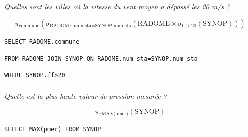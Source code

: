 \subparagraph{}
\textit{Quelles sont les villes où la vitesse du vent moyen a dépassé les 20 m/s ? }
\ifprof
\begin{corrige}
$$ \pi_{\text{commune}}\left(\sigma_{\text{RADOME.num\_sta=SYNOP.num\_sta}} \left(\text{RADOME} \times \sigma_{\text{ff}>20}\left(\text{SYNOP} \right) \right)\right) $$

\hspace{1cm} \texttt{SELECT RADOME.commune}

\hspace{2cm} \texttt{FROM RADOME JOIN SYNOP ON RADOME.num\_sta=SYNOP.num\_sta}

\hspace{2cm} \texttt{WHERE SYNOP.ff>20}

\end{corrige}
\else
\fi
\subparagraph{}
\textit{Quelle est la plus haute valeur de pression mesurée ?}
\ifprof
\begin{corrige}
$$ \pi_{\gamma \text{MAX(pmer)}}\left(\text{SYNOP}\right) $$

\begin{center}
\texttt{SELECT MAX(pmer) FROM SYNOP}
\end{center}

\end{corrige}
\else
\fi
%
%
%
%
%
